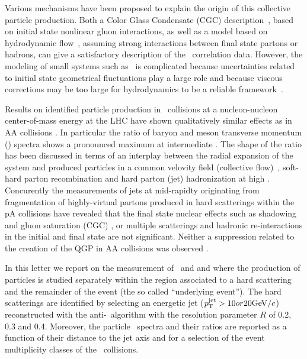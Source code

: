 Various mechanisms have been proposed to explain the origin of this collective particle production. 
Both a Color Glass Condensate (CGC)
description~\cite{Dusling:2013oia}, based on initial state nonlinear
gluon interactions, as well as a model based on hydrodynamic
flow~\cite{Bozek:2012gr,Qin:2013bha}, assuming strong interactions
between final state partons or hadrons, can give a satisfactory
description of the \pPb\ correlation data. However, the modeling of
small systems such as \pPb\ is complicated because uncertainties
related to initial state geometrical fluctuations play a large role
and because viscous corrections may be too large for hydrodynamics to
be a reliable framework~\cite{Bzdak:2013zma}.

Results on identified particle production in \pPb\ collisions at a nucleon-nucleon center-of-mass energy  at the LHC \cite{Abelev:2013haa} have shown qualitatively similar effects as in AA collisions \cite{Abelev:2013xaa,ABELEV:2013wsa}. In particular the ratio of baryon and meson transverse momentum (\pt) spectra shows a pronounced maximum at intermediate \pt. The shape of the ratio has been discussed in terms of an interplay between the radial expansion of the system and produced particles in a common velovity field (collective flow)~\cite{Schnedermann:1993ws}, soft-hard parton recombination \cite{Fries:2003vb} and hard parton (jet) hadronization at high \pT. Concurently the measurements of jets at mid-rapidty originating from fragmentation of highly-virtual partons produced in hard scatterings within the pA collisions \cite{Adam:2015hoa,Adam:2015xea} have revealed that the final state nuclear effects such as shadowing and gluon saturation (CGC) \cite{McLerran:2001sr,Salgado:2011wc}, or multiple scatterings and hadronic re-interactions in the initial and final state \cite{Krzywicki:1979gv,Accardi:2007in} are not significant. Neither a suppression related to the creation of the QGP in AA collisions was observed \cite{Aad:2010bu,Chatrchyan:2012nia,Aad:2012vca,Abelev:2013kqa,Aad:2014bxa}.

In this letter we report on the measurement of \lda\ and \alda and \ks where the production of particles is studied separately within the region associated to a hard scattering and the remainder of the event (the so called ``underlying event''). The hard scatterings are identified by selecting an energetic jet ($p_{\mathrm{T}}^{\mathrm{jet}} > 10 or 20 \mathrm{GeV}/c$) reconstructed with the anti-\kt\ algorithm with the resolution parameter $R$ of 0.2, 0.3 and 0.4. Moreover, the particle \pt\ spectra and their ratios are reported as a function of their distance to the jet axis and for a selection of the event multiplicity classes of the \pPb\ collisions.


